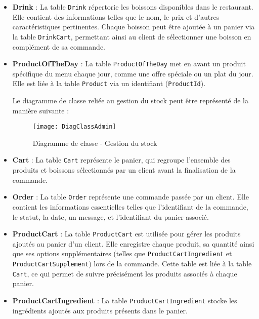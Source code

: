 \begin{itemize}
    \item \textbf{Drink} : La table \texttt{Drink} répertorie les boissons disponibles dans le restaurant. Elle contient des informations telles que le nom, le prix et d'autres caractéristiques pertinentes. Chaque boisson peut être ajoutée à un panier via la table \texttt{DrinkCart}, permettant ainsi au client de sélectionner une boisson en complément de sa commande.

    \item \textbf{ProductOfTheDay} : La table \texttt{ProductOfTheDay} met en avant un produit spécifique du menu chaque jour, comme une offre spéciale ou un plat du jour. Elle est liée à la table \texttt{Product} via un identifiant (\texttt{ProductId}).

    Le diagramme de classe reliée au gestion du stock peut être représenté de la manière suivante : \\
    \begin{figure}[H]
        \centering
        \texttt{[image: DiagClassAdmin]}
        \caption{Diagramme de classe - Gestion du stock}
        \label{fig:class_admin}
    \end{figure}
    
    \item \textbf{Cart} : La table \texttt{Cart} représente le panier, qui regroupe l'ensemble des produits et boissons sélectionnés par un client avant la finalisation de la commande.

    \item \textbf{Order} : La table \texttt{Order} représente une commande passée par un client. Elle contient les informations essentielles telles que l'identifiant de la commande, le statut, la date, un message, et l'identifiant du panier associé.


    \item \textbf{ProductCart} : La table \texttt{ProductCart} est utilisée pour gérer les produits ajoutés au panier d'un client. Elle enregistre chaque produit, sa quantité ainsi que ses options supplémentaires (telles que \texttt{ProductCartIngredient} et \texttt{ProductCartSupplement}) lors de la commande. Cette table est liée à la table \texttt{Cart}, ce qui permet de suivre précisément les produits associés à chaque panier.

    \item \textbf{ProductCartIngredient} : La table \texttt{ProductCartIngredient} stocke les ingrédients ajoutés aux produits présents dans le panier.


\end{itemize}
